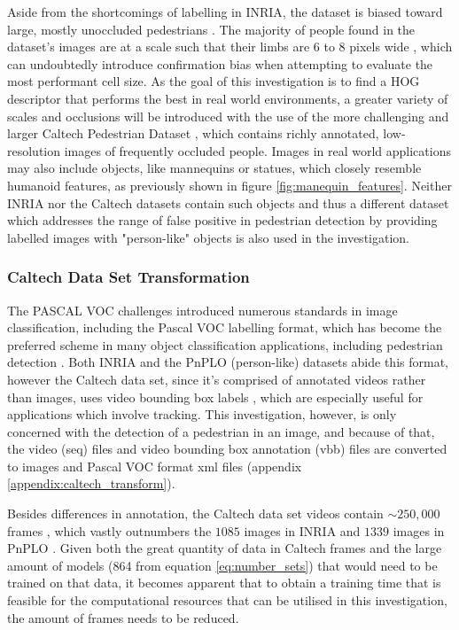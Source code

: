 Aside from the shortcomings of labelling in INRIA, the dataset is biased toward large, mostly unoccluded pedestrians \cite{dollar_2009_pedestrian}. The majority of people found in the dataset’s images are at a scale such that their limbs are 6 to 8 pixels wide \cite{dalal_2005_histograms}, which can undoubtedly introduce confirmation bias when attempting to evaluate the most performant cell size. As the goal of this investigation is to find a HOG descriptor that performs the best in real world environments, a greater variety of scales and occlusions will be introduced with the use of the more challenging and larger Caltech Pedestrian Dataset \cite{dollar_2009_pedestrian}, which contains richly annotated, low-resolution images of frequently occluded people. Images in real world applications may also include objects, like mannequins or statues, which closely resemble humanoid features, as previously shown in figure \ref{fig:manequin_features}. Neither INRIA nor the Caltech datasets contain such objects and thus a different dataset which addresses the range of false positive in pedestrian detection by providing labelled images with "person-like" objects \cite{karthika_2020_addressing} is also used in the investigation.

\subsubsection{Caltech Data Set Transformation}\label{sec:caltech_trasnform}

The PASCAL VOC challenges \cite{everingham_2009_pascal} introduced numerous standards in image classification, including the Pascal VOC labelling format, which has become the preferred scheme in many object classification applications, including pedestrian detection \cite{dollar_2012_pedestrian}. Both INRIA and the PnPLO (person-like) datasets abide this format, however the Caltech data set, since it's comprised of annotated videos rather than images, uses video bounding box labels \cite{mathworks_vbbLabeler}, which are especially useful for applications which involve tracking. This investigation, however, is only concerned with the detection of a pedestrian in an image, and because of that, the video (seq) files and video bounding box annotation (vbb) files are converted to images and Pascal VOC format xml files (appendix \ref{appendix:caltech_transform}). 

Besides differences in annotation, the Caltech data set videos contain $\sim 250,000$ frames \cite{dollar_2009_pedestrian}, which vastly outnumbers the $1085$ images in INRIA \cite{dalal_2005_histograms} and $1339$ images in PnPLO \cite{karthika_2020_addressing}. Given both the great quantity of data in Caltech frames and the large amount of models (864 from equation \ref{eq:number_sets}) that would need to be trained on that data, it becomes apparent that to obtain a training time that is feasible for the computational resources that can be utilised in this investigation, the amount of frames needs to be reduced. 

